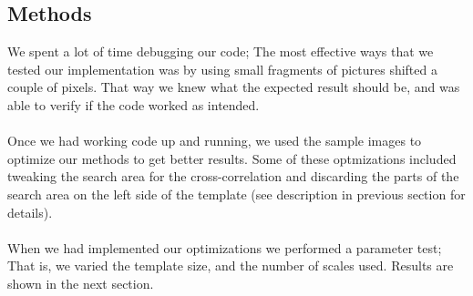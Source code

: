 \documentclass[12pt,a4paper,oneside,final]{article}
\begin{document}
	\subsection{Methods}
	We spent a lot of time debugging our code; The most effective ways that we tested our implementation was by using small fragments of pictures shifted a couple of pixels. That way we knew what the expected result should be, and was able to verify if the code worked as intended.\\\\
	Once we had working code up and running, we used the sample images to optimize our methods to get better results. Some of these optmizations included tweaking the search area for the cross-correlation and discarding the parts of the search area on the left side of the template (see description in previous section for details).\\\\
	When we had implemented our optimizations we performed a parameter test; That is, we varied the template size, and the number of scales used. Results are shown in the next section.
	
\end{document}
